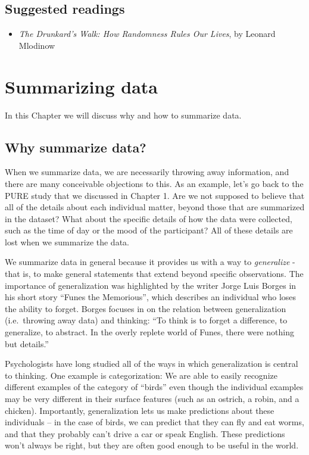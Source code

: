 \documentclass[]{book}
\providecommand{\tightlist}{%
  \setlength{\itemsep}{0pt}\setlength{\parskip}{0pt}}
\theoremstyle{definition}
\theoremstyle{definition}
\theoremstyle{definition}
\theoremstyle{remark}
\begin{document}
\section{Suggested readings}\label{suggested-readings-2}

\begin{itemize}
\tightlist
\item
  \emph{The Drunkard's Walk: How Randomness Rules Our Lives}, by Leonard
  Mlodinow
\end{itemize}

\chapter{Summarizing data}\label{summarizing-data}

In this Chapter we will discuss why and how to summarize data.

\section{Why summarize data?}\label{why-summarize-data}

When we summarize data, we are necessarily throwing away information,
and there are many conceivable objections to this. As an example, let's
go back to the PURE study that we discussed in Chapter 1. Are we not
supposed to believe that all of the details about each individual
matter, beyond those that are summarized in the dataset? What about the
specific details of how the data were collected, such as the time of day
or the mood of the participant? All of these details are lost when we
summarize the data.

We summarize data in general because it provides us with a way to
\emph{generalize} - that is, to make general statements that extend
beyond specific observations. The importance of generalization was
highlighted by the writer Jorge Luis Borges in his short story ``Funes
the Memorious'', which describes an individual who loses the ability to
forget. Borges focuses in on the relation between generalization
(i.e.~throwing away data) and thinking: ``To think is to forget a
difference, to generalize, to abstract. In the overly replete world of
Funes, there were nothing but details.''

Psychologists have long studied all of the ways in which generalization
is central to thinking. One example is categorization: We are able to
easily recognize different examples of the category of ``birds'' even
though the individual examples may be very different in their surface
features (such as an ostrich, a robin, and a chicken). Importantly,
generalization lets us make predictions about these individuals -- in
the case of birds, we can predict that they can fly and eat worms, and
that they probably can't drive a car or speak English. These predictions
won't always be right, but they are often good enough to be useful in
the world.
\end{document}

